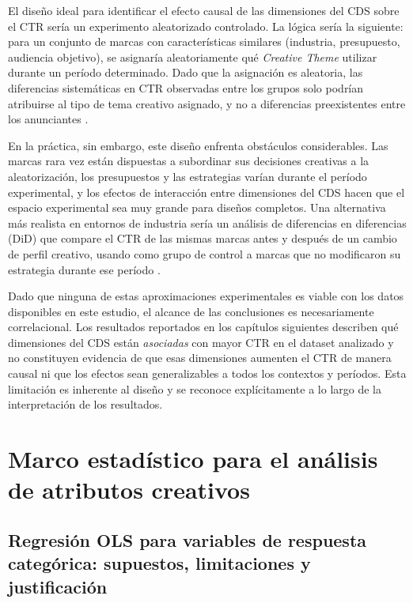 \documentclass[12pt, a4paper]{report}
\begin{document}
El diseño ideal para identificar el efecto causal de las dimensiones del CDS sobre el CTR sería un
experimento aleatorizado controlado. La lógica sería la siguiente: para un conjunto de marcas con
características similares (industria, presupuesto, audiencia objetivo), se asignaría aleatoriamente
qué \textit{Creative Theme} utilizar durante un período determinado. Dado que la asignación es
aleatoria, las diferencias sistemáticas en CTR observadas entre los grupos solo podrían atribuirse
al tipo de tema creativo asignado, y no a diferencias preexistentes entre los anunciantes
\citep{cunningham2021}.

En la práctica, sin embargo, este diseño enfrenta obstáculos considerables. Las marcas rara vez
están dispuestas a subordinar sus decisiones creativas a la aleatorización, los presupuestos y las
estrategias varían durante el período experimental, y los efectos de interacción entre dimensiones
del CDS hacen que el espacio experimental sea muy grande para diseños completos. Una
alternativa más realista en entornos de industria sería un análisis de diferencias en diferencias
(DiD) que compare el CTR de las mismas marcas antes y después de un cambio de perfil creativo,
usando como grupo de control a marcas que no modificaron su estrategia durante ese período
\citep{cunningham2021}.

Dado que ninguna de estas aproximaciones experimentales es viable con los datos disponibles en este
estudio, el alcance de las conclusiones es necesariamente correlacional. Los resultados reportados
en los capítulos siguientes describen qué dimensiones del CDS están \textit{asociadas} con mayor
CTR en el dataset analizado y no constituyen evidencia de que esas dimensiones aumenten el CTR de
manera causal ni que los efectos sean generalizables a todos los contextos y períodos. Esta
limitación es inherente al diseño y se reconoce explícitamente a lo largo de la interpretación
de los resultados.

\section{Marco estadístico para el análisis de atributos creativos}

\subsection{Regresión OLS para variables de respuesta categórica:
            supuestos, limitaciones y justificación}
\end{document}
